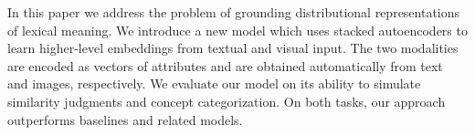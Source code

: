 In this paper we address the problem of grounding distributional representations of lexical meaning. We introduce a new model which uses stacked autoencoders to  learn higher-level embeddings from textual and visual input. The two modalities are encoded as vectors of attributes and are obtained automatically from text and images, respectively. We evaluate our model on its ability to simulate similarity judgments and concept categorization. On both tasks, our approach outperforms baselines and related models.
